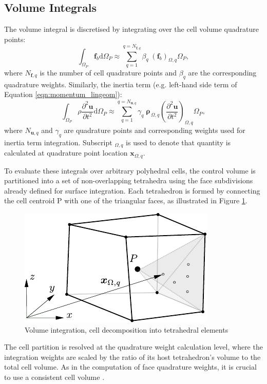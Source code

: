 \documentclass[sn-mathphys,Numbered]{sn-jnl}%
\newcommand{\bb}{\boldsymbol}
\begin{document}
\subsection{Volume Integrals}
\label{sec:vol_int}
%
The volume integral is discretised by integrating over the cell volume quadrature points:
%
\begin{equation}
\int_{\Omega_P} \bb{f}_b \text{d}\Omega_P
\approx
 \sum_{q=1}^{q=N_{\bb{f},q}}\beta_q \; \left(\bb{f}_b\right)_{\Omega,q}  \Omega_P,
\end{equation}
%
where $N_{\bb{f},q}$ is the number of cell quadrature points and $\beta_q$ are the corresponding quadrature weights.
Similarly, the inertia term (e.g. left-hand side term of Equation \eqref{eqn:momentum_lingeom}):
%
\begin{equation}
\int_{\Omega_P} \rho \frac{\partial^2 \bb{u}}{\partial t^2} \text{d}\Omega_P
\approx
 \sum_{q=1}^{q=N_{\bb{u},q}}\gamma_q \; \bb{\rho}_{\,\Omega,q}  \left(\frac{\partial^2 \bb{u}}{\partial t^2} \right)_{\Omega,q}  \Omega_P,
\end{equation}
%
where $N_{\bb{u},q}$ and $\gamma_q$ are quadrature points and corresponding weights used for inertia term integration. Subscript $_{\Omega,q}$ is used to denote that quantity is calculated at quadrature point location $\bb{x}_{\Omega,q}$.

To evaluate these integrals over arbitrary polyhedral cells, the control volume is partitioned into a set of non-overlapping tetrahedra using the face subdivisions already defined for surface integration.
Each tetrahedron is formed by connecting the cell centroid P with one of the triangular faces, as illustrated in Figure \ref{fig:volumeTerm}.
\begin{figure}[h]
 	\centering
    \includegraphics[scale=0.8]{figures/volumeTerm} 
 	\caption{Volume integration, cell decomposition into tetrahedral elements}
 	\label{fig:volumeTerm}
\end{figure}
The cell partition is resolved at the quadrature weight calculation level, where the integration weights are scaled by the ratio of its host tetrahedron’s volume to the total cell volume. As in the computation of face quadrature weights, it is crucial to use a consistent cell volume \cite{Nishikawa2025}.
%
\end{document}
